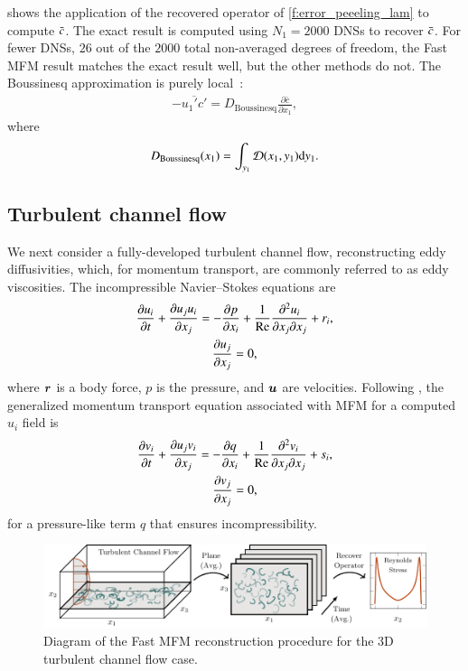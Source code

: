  shows the application of the recovered operator of \cref{f:error_peeeling_lam} to compute $\bar{c}$. 
The exact result is computed using $N_1 = 2000$ DNSs to recover $\bar{c}$.
For fewer DNSs, $26$ out of the $2000$ total non-averaged degrees of freedom, the Fast MFM result matches the exact result well, but the other methods do not. 
The Boussinesq approximation is purely local~\citep{hamba2004nonlocal}:
\begin{gather}
    -\overline{u_1'c'} = D_{\mathrm{Boussinesq}}\frac{\partial \bar{c}}{\partial x_1},
\end{gather}
where
\begin{gather}
    D_{\mathrm{Boussinesq}}(x_1) = 
    \int_{y_1} \mathcal{D}(x_1,y_1) \text{d} y_1.
\end{gather}

\subsection{Turbulent channel flow}

We next consider a fully-developed turbulent channel flow, reconstructing eddy diffusivities, which, for momentum transport, are commonly referred to as eddy viscosities.
The incompressible Navier--Stokes equations are
\begin{gather}
    \frac{ \partial u_i}{\partial t} + 
    \frac{\partial u_j u_i}{\partial x_j} = 
    -\frac{\partial p}{\partial x_i} + 
    \frac{1}{\mbox{\text{Re}}} \frac{\partial^2 u_i}{\partial x_j \partial x_j} + r_i, \\
    \frac{\partial u_j}{\partial x_j} = 0,
\end{gather}
where $\bm{r}$ is a body force, $p$ is the pressure, and $\bm{u}$ are velocities.
Following \citet{maniMacroscopicForcingMethod2021}, the generalized momentum transport equation associated with MFM for a computed $u_i$ field is
\begin{gather}
    \frac{ \partial v_i}{\partial t} + 
    \frac{\partial u_j v_i}{\partial x_j} = 
    -\frac{\partial q}{\partial x_i} + 
    \frac{1}{\mbox{\text{Re}}} \frac{\partial^2 v_i}{\partial x_j \partial x_j} + s_i, \\
    \frac{\partial v_j}{\partial x_j} = 0,
\end{gather}
for a pressure-like term $q$ that ensures incompressibility. 

\begin{figure}
    \centering
    \includegraphics[scale=1]{figures/3d-channel.pdf}
    \caption{
        Diagram of the Fast MFM reconstruction procedure for the 3D turbulent channel flow case.
    }
    \label{f:schematic-turb}
\end{figure}

